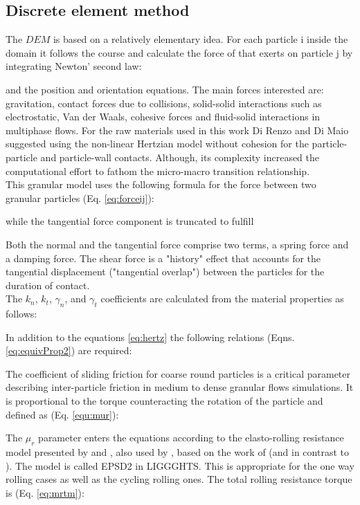 \subsection{Discrete element method}
\label{subsec:dem}
The $DEM$ is based on a relatively elementary idea. For each particle i inside
the domain it follows the course and calculate the force of that exerts on particle j
by integrating Newton' second law:

 
and the position and orientation equations.
The main forces interested are: gravitation, contact forces due to collisions,
solid-solid interactions such as electrostatic, Van der Waals, cohesive forces
and fluid-solid interactions in multiphase flows.
For the raw materials used in this work Di Renzo and Di Maio \cite{RefWorks:145}
suggested using the non-linear Hertzian model without cohesion for the particle-particle and particle-wall contacts.
Although, its complexity increased the computational effort to fathom the
micro-macro transition relationship.\\
This granular model uses the following formula for the force between two granular particles (Eq. \ref{eq:forceij}):

while the tangential force component is truncated to fulfill

Both the normal and the tangential force comprise two terms, a spring force and a damping force. The shear force is a "history" effect that accounts for the tangential displacement 
("tangential overlap") between the particles for the duration of contact. \\

The $k_n$, $k_t$, $\gamma_n$, and $\gamma_t$ coefficients are calculated from the material properties as follows:

In addition to the equations \ref{eq:hertz} the following relations (Eqns. \ref{eq:equivProp2}) are required:

The coefficient of sliding friction for coarse round particles is a critical
parameter describing inter-particle friction in medium to dense granular flows simulations.
It is proportional to the torque counteracting the rotation of the particle and defined as (Eq. \ref{equ:mur}):

The $\mu_r$ parameter enters the equations according to the elasto-rolling
resistance model presented by \cite{RefWorks:87} and \cite{RefWorks:131}, also
used by \cite{RefWorks:173}, based on the work of
\cite{RefWorks:143}(and in contrast to \cite{RefWorks:144}). The model is called EPSD2 in LIGGGHTS.
This is appropriate for the one way rolling cases as well as the cycling rolling ones.
The total rolling resistance torque is (Eq. \ref{eq:mrtm}):


